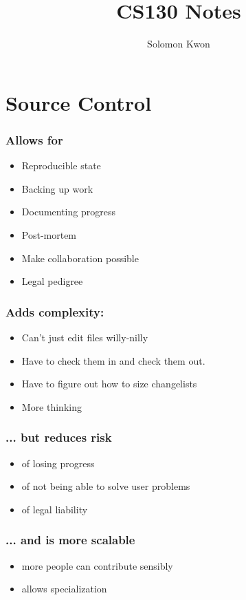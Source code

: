 \documentclass{article}
\title{CS130 Notes}
\author{Solomon Kwon}
\begin{document}
\maketitle

\tableofcontents

\pagebreak

\section{Source Control}

\subsubsection*{Allows for}
\begin{itemize}
    \item Reproducible state
    \item Backing up work
    \item Documenting progress
    \item Post-mortem
    \item Make collaboration possible
    \item Legal pedigree
\end{itemize}

\vspace*{1em}

\subsubsection*{Adds complexity:}

\begin{itemize}
    \item Can't just edit files willy-nilly
    \item Have to check them in and check them out.
    \item Have to figure out how to size changelists
    \item More thinking
\end{itemize}
\begin{multicols}{2}
    \subsubsection*{... but reduces risk}
        \begin{itemize}
            \item of losing progress
            \item of not being able to solve user problems
            \item of legal liability
        \end{itemize}
    \subsubsection*{... and is more scalable}
        \begin{itemize}
            \item more people can contribute sensibly
            \item allows specialization
        \end{itemize}
\end{multicols}
\end{document}
